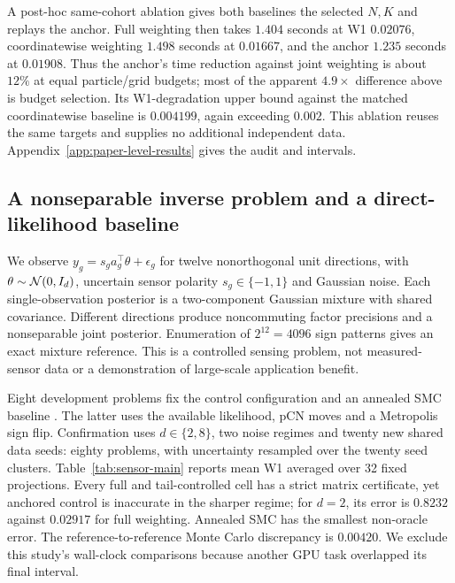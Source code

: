 A post-hoc same-cohort ablation gives both baselines the selected $N,K$ and replays the anchor. Full weighting then takes $1.404$ seconds at W1 $0.02076$, coordinatewise weighting $1.498$ seconds at $0.01667$, and the anchor $1.235$ seconds at $0.01908$. Thus the anchor's time reduction against joint weighting is about $12\%$ at equal particle/grid budgets; most of the apparent $4.9\times$ difference above is budget selection. Its W1-degradation upper bound against the matched coordinatewise baseline is $0.004199$, again exceeding $0.002$. This ablation reuses the same targets and supplies no additional independent data. Appendix~\ref{app:paper-level-results} gives the audit and intervals.

\subsection{A nonseparable inverse problem and a direct-likelihood baseline}
We observe $y_g=s_ga_g^\top\theta+\epsilon_g$ for twelve nonorthogonal unit directions, with $\theta\sim\mathcal N(0,I_d)$, uncertain sensor polarity $s_g\in\{-1,1\}$ and Gaussian noise. Each single-observation posterior is a two-component Gaussian mixture with shared covariance. Different directions produce noncommuting factor precisions and a nonseparable joint posterior. Enumeration of $2^{12}=4096$ sign patterns gives an exact mixture reference. This is a controlled sensing problem, not measured-sensor data or a demonstration of large-scale application benefit.

Eight development problems fix the control configuration and an annealed SMC baseline \citep{delmoral2006,cotter2013}. The latter uses the available likelihood, pCN moves and a Metropolis sign flip. Confirmation uses $d\in\{2,8\}$, two noise regimes and twenty new shared data seeds: eighty problems, with uncertainty resampled over the twenty seed clusters. Table~\ref{tab:sensor-main} reports mean W1 averaged over 32 fixed projections. Every full and tail-controlled cell has a strict matrix certificate, yet anchored control is inaccurate in the sharper regime; for $d=2$, its error is $0.8232$ against $0.02917$ for full weighting. Annealed SMC has the smallest non-oracle error. The reference-to-reference Monte Carlo discrepancy is $0.00420$. We exclude this study's wall-clock comparisons because another GPU task overlapped its final interval.

